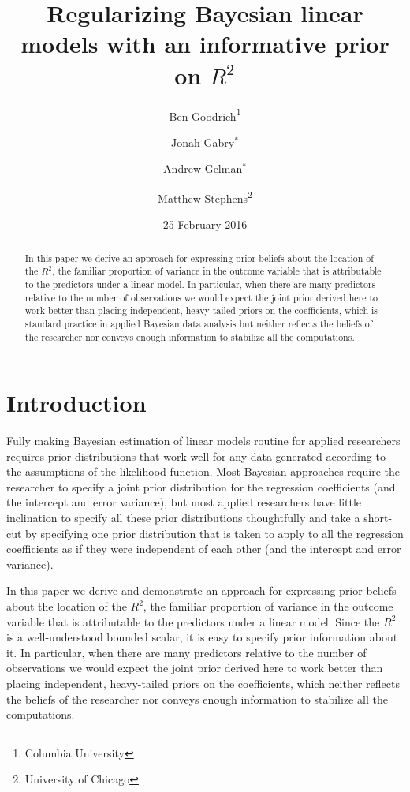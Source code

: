 \documentclass[11pt]{article}
\title{\bf Regularizing Bayesian linear models with an informative prior on $R^2$\vspace{.1in}}
\author{Ben Goodrich\footnote{Columbia University} \and Jonah Gabry$^{\ast}$
\and Andrew Gelman$^{\ast}$ \and Matthew Stephens\footnote{University of Chicago}\vspace{.1in}}
\date{25 February 2016\vspace{-.2in}}
\begin{document}
\maketitle
\thispagestyle{empty}

\begin{abstract}
\noindent In this paper we derive an approach for expressing prior beliefs about
the location of the $R^2$, the familiar proportion of variance in the outcome
variable that is attributable to the predictors under a linear model. In
particular, when there are many predictors relative to the number of
observations we would expect the joint prior derived here to work better than
placing independent, heavy-tailed priors on the coefficients, which is  standard
practice in applied Bayesian data analysis but neither reflects the beliefs of
the researcher nor conveys enough information to stabilize all the computations.
\end{abstract}

\section{Introduction}

Fully making Bayesian estimation of linear models routine for applied
researchers requires prior distributions that work well for any data generated
according to the assumptions of the likelihood function. Most Bayesian
approaches require the researcher to specify a joint prior distribution for the
regression coefficients (and the intercept and error variance), but most applied
researchers have little inclination to specify all these prior distributions
thoughtfully and take a short-cut by specifying one prior distribution that is
taken to apply to all the regression coefficients as if they were independent of
each other (and the intercept and error variance).

In this paper we derive and demonstrate an approach for expressing  prior
beliefs about the location of the $R^2$, the familiar proportion of variance in
the outcome variable that is attributable to the predictors under a linear
model. Since the $R^2$ is a well-understood bounded scalar, it is easy to
specify prior information about it. In particular, when there are many
predictors relative to the number of observations we would expect the joint
prior derived here to work better than placing independent, heavy-tailed priors
on the coefficients, which neither reflects the beliefs of the researcher nor
conveys enough information to stabilize all the computations.
\end{document}
